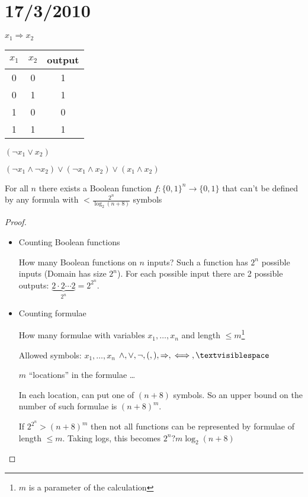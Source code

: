 \documentclass{article}
\begin{document}
\section*{17/3/2010}

$x_1 \Rightarrow x_2$ 

\begin{tabular}{|c|c|c|}
\hline $x_1$ & $x_2$ & output \\ \hline
0 & 0 & 1 \\ \hline
0 & 1 & 1 \\ \hline
1 & 0 & 0 \\ \hline
1 & 1 & 1 \\ \hline
\end{tabular}

$(\neg x_1 \lor x_2)$

$(\neg x_1 \land \neg x_2) \lor (\neg x_1 \land x_2) \lor (x_1 \land x_2)$

\begin{prop}
For all $n$ there exists a Boolean function $f:\{0, 1\}^n \rightarrow \{0,1\}$ that can't be defined by any formula with $ < \frac{2^n}{\log_2(n+8)}$ symbols
\end{prop}

\begin{proof}
\begin{itemize}
\item Counting Boolean functions

How many Boolean functions on $n$ inputs?  Such a function has $2^n$ possible inputs (Domain has size $2^n$).  For each possible input there are 2 possible outputs: $\underbrace{2 \cdot 2 \cdots 2}_{2^n} =2^{2^n}$.

\item Counting formulae

How many formulae with variables $x_1, \ldots, x_n$ and length $\le m$\footnote{$m$ is a parameter of the calculation}

Allowed symbols: $x_1, \ldots, x_n$ $\land, \lor, \neg, (, ), \Rightarrow, \iff, \textvisiblespace$

$m$ ``locations'' in the formulae \textvisiblespace \textvisiblespace \dots \textvisiblespace

In each location, can put one of $(n+8)$ symbols.  So an upper bound on the number of such formulae is $(n+8)^{m}$.

If $2^{2^n}>(n+8)^m$ then not all functions can be represented by formulae of length $\le m$.  Taking logs, this becomes $2^n ? m \log_2(n+8)$

\end{itemize}
\end{proof}
\end{document}
